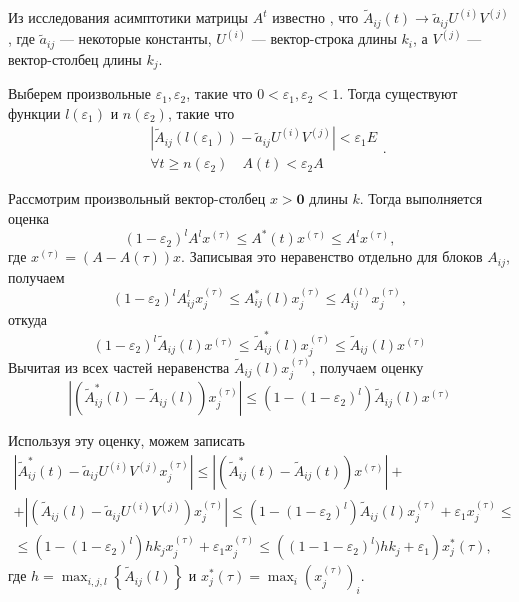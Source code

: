 \documentclass[12pt]{article}
\renewcommand{\leq}{\leqslant}
\renewcommand{\geq}{\geqslant}
\renewcommand{\epsilon}{\varepsilon}
\begin{document}
Из исследования асимптотики матрицы $A^t$ известно \cite{zhiltsova-about-matrix}, что $\tilde{A}_{ij}(t) \rightarrow \tilde{a}_{ij} U^{(i)} V^{(j)}$, где $\tilde{a}_{ij}$ --- некоторые константы, $U^{(i)}$ --- вектор-строка длины $k_i$, а $V^{(j)}$ --- вектор-столбец длины $k_j$.

Выберем произвольные $\epsilon_1, \epsilon_2$, такие что $0 < \epsilon_1, \epsilon_2 < 1$. Тогда существуют функции $l(\epsilon_1)$ и $n(\epsilon_2)$, такие что
\begin{equation}
	\begin{split}
		&\left| \tilde{A}_{ij}(l(\epsilon_1)) - \tilde{a}_{ij} U^{(i)} V^{(j)} \right| < \epsilon_1 E \\
		&\forall t \geq n(\epsilon_2)\quad A(t) < \epsilon_2 A
	\end{split}.
\end{equation}

Рассмотрим произвольный вектор-столбец $x > \mathbf{0}$ длины $k$. Тогда выполняется оценка
\begin{equation}
	(1 - \epsilon_2)^l A^l x^{(\tau)} \leq A^*(t) x^{(\tau)} \leq A^l x^{(\tau)},
\end{equation}
где $x^{(\tau)} = (A - A(\tau)) x$. Записывая это неравенство отдельно для блоков $A_{ij}$, получаем
\begin{equation}
	(1 - \epsilon_2)^l A_{ij}^l x^{(\tau)}_j \leq A^*_{ij}(l) x^{(\tau)}_j \leq A^{(l)}_{ij} x^{(\tau)}_j,
\end{equation}
откуда
\begin{equation}
	(1 - \epsilon_2)^l \tilde{A}_{ij}(l) x^{(\tau)} \leq \tilde{A}^*_{ij}(l) x^{(\tau)}_j \leq \tilde{A}_{ij}(l) x^{(\tau)}
\end{equation}
Вычитая из всех частей неравенства $\tilde{A}_{ij}(l) x^{(\tau)}_j$, получаем оценку
\begin{equation}
	\left| \left( \tilde{A}^*_{ij}(l) - \tilde{A}_{ij}(l) \right) x^{(\tau)}_j \right| \leq (1 - (1 - \epsilon_2)^l) \tilde{A}_{ij}(l) x^{(\tau)}
\end{equation}

Используя эту оценку, можем записать
\begin{multline}
	\left| \tilde{A}^*_{ij}(t) - \tilde{a}_{ij} U^{(i)} V^{(j)} x^{(\tau)}_j \right| \leq \left| \left( \tilde{A}^*_{ij}(t) - \tilde{A}_{ij}(t) \right) x^{(\tau)} \right| + \\
	+ \left| \left( \tilde{A}_{ij}(l) - \tilde{a}_{ij} U^{(i)} V^{(j)} \right) x^{(\tau)}_j \right| \leq (1 - (1 - \epsilon_2)^l) \tilde{A}_{ij}(l) x^{(\tau)}_j + \epsilon_1 x^{(\tau)}_j \leq \\
	\leq (1 - (1 - \epsilon_2)^l) h k_j x^{(\tau)}_j + \epsilon_1 x^{(\tau)}_j \leq \left( (1 - 1 - \epsilon_2)^l) h k_j + \epsilon_1 \right) x^*_j(\tau),
\end{multline}
где $h = \max_{i,j,l} \left\{ \tilde{A}_{ij}(l) \right\}$ и $x^*_j(\tau) = \max_i (x^{(\tau)}_j)_i$.
\end{document}
